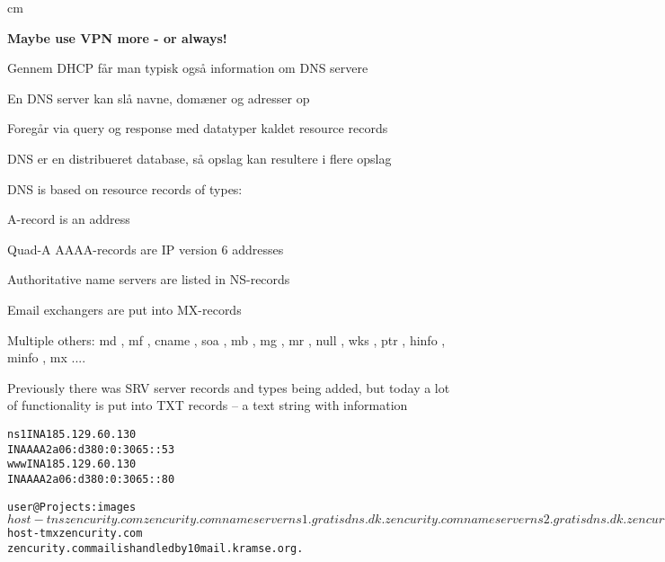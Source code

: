 \documentclass[Screen16to9,17pt]{foils}
\begin{document}
 cm
\centerline{\bf\Large Maybe use VPN more - or always!}





\begin{list1}
\item Gennem DHCP får man typisk også information om DNS servere
\item En DNS server kan slå navne, domæner og adresser op
\item Foregår via query og response med datatyper kaldet resource records
\item DNS er en distribueret database, så opslag kan resultere i flere opslag
\end{list1}




\begin{list1}
  \item DNS is based on resource records of types:
    \begin{list2}
\item A-record is an address
\item Quad-A AAAA-records are IP version 6 addresses
\item Authoritative name servers are listed in NS-records
\item Email exchangers are put into MX-records
\item Multiple others: md ,  mf ,  cname ,  soa ,
                  mb , mg ,  mr ,  null ,  wks ,  ptr ,
                  hinfo ,  minfo ,  mx ....
\item Previously there was SRV server records and types being added, but today a lot of functionality is put into TXT records -- a text string with information
\end{list2}
\end{list1}

\begin{alltt}
ns1     IN      A       185.129.60.130
        IN      AAAA    2a06:d380:0:3065::53
www     IN      A       185.129.60.130
        IN      AAAA    2a06:d380:0:3065::80
\end{alltt}



\begin{alltt}
user@Projects:images$ host -t ns zencurity.com
zencurity.com name server ns1.gratisdns.dk.
zencurity.com name server ns2.gratisdns.dk.
zencurity.com name server ns3.gratisdns.dk.
zencurity.com name server ns4.gratisdns.dk.
zencurity.com name server ns5.gratisdns.dk.
user@Projects:images$ host -t mx zencurity.com
zencurity.com mail is handled by 10 mail.kramse.org.
\end{alltt}
\end{document}
